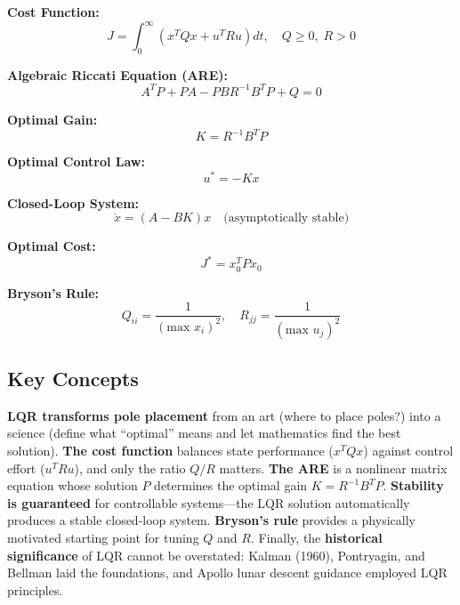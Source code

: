 \begin{tcolorbox}[colback=blue!5!white, colframe=blue!75!black, title=LQR Key Equations, sharp corners]

\textbf{Cost Function:}
\begin{equation}
J = \int_0^\infty \left( x^T Q x + u^T R u \right) dt, \quad Q \geq 0, \; R > 0
\end{equation}

\textbf{Algebraic Riccati Equation (ARE):}
\begin{equation}
A^T P + PA - PBR^{-1}B^T P + Q = 0
\end{equation}

\textbf{Optimal Gain:}
\begin{equation}
K = R^{-1} B^T P
\end{equation}

\textbf{Optimal Control Law:}
\begin{equation}
u^* = -Kx
\end{equation}

\textbf{Closed-Loop System:}
\begin{equation}
\dot{x} = (A - BK)x \quad \text{(asymptotically stable)}
\end{equation}

\textbf{Optimal Cost:}
\begin{equation}
J^* = x_0^T P x_0
\end{equation}

\textbf{Bryson's Rule:}
\begin{equation}
Q_{ii} = \frac{1}{(\text{max } x_i)^2}, \quad R_{jj} = \frac{1}{(\text{max } u_j)^2}
\end{equation}

\end{tcolorbox}

\subsection{Key Concepts}

\textbf{LQR transforms pole placement} from an art (where to place poles?) into a science (define what ``optimal'' means and let mathematics find the best solution). \textbf{The cost function} balances state performance ($x^T Q x$) against control effort ($u^T R u$), and only the ratio $Q/R$ matters. \textbf{The ARE} is a nonlinear matrix equation whose solution $P$ determines the optimal gain $K = R^{-1}B^T P$. \textbf{Stability is guaranteed} for controllable systems---the LQR solution automatically produces a stable closed-loop system. \textbf{Bryson's rule} provides a physically motivated starting point for tuning $Q$ and $R$. Finally, the \textbf{historical significance} of LQR cannot be overstated: Kalman (1960), Pontryagin, and Bellman laid the foundations, and Apollo lunar descent guidance employed LQR principles.

